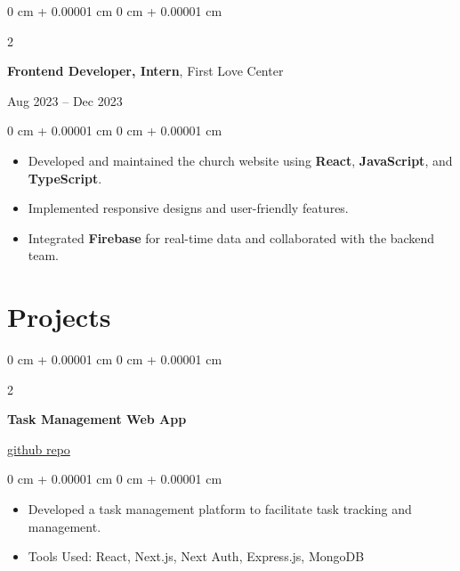 \documentclass[10pt, letterpaper]{article}
\newenvironment{highlights}{
    \begin{itemize}[
        topsep=0.10 cm,
        parsep=0.10 cm,
        partopsep=0pt,
        itemsep=0pt,
        leftmargin=0 cm + 10pt
    ]
}{
    \end{itemize}
} %
\newenvironment{onecolentry}{
    \begin{adjustwidth}{
        0 cm + 0.00001 cm
    }{
        0 cm + 0.00001 cm
    }
}{
    \end{adjustwidth}
} %
\newenvironment{twocolentry}[2][]{
    \onecolentry
    \def\secondColumn{#2}
    \setcolumnwidth{\fill, 4.5 cm}
    \begin{paracol}{2}
}{
    \switchcolumn \raggedleft \secondColumn
    \end{paracol}
    \endonecolentry
} %
\begin{document}
\vspace{0.30 cm}

\begin{twocolentry}{Aug 2023 – Dec 2023}
    \textbf{Frontend Developer, Intern}, First Love Center
\end{twocolentry}

\vspace{0.10 cm}
\begin{onecolentry}
    \begin{highlights}
        \item Developed and maintained the church website using \textbf{React},
        \textbf{JavaScript}, and \textbf{TypeScript}.
        \item Implemented responsive designs and user-friendly features.
        \item Integrated \textbf{Firebase} for real-time data and collaborated with the
        backend team.
    \end{highlights}
\end{onecolentry}

\vspace{0.30 cm}

\section{Projects}

\begin{twocolentry}{\href{https://github.com/murvyn/taskify}{github repo}}
    \textbf{Task Management Web App}
\end{twocolentry}
\vspace{0.10 cm}
\begin{onecolentry}
    \begin{highlights}
        \item Developed a task management platform to facilitate task tracking and
        management.
        \item Tools Used: React, Next.js, Next Auth, Express.js, MongoDB
    \end{highlights}
\end{onecolentry}

\vspace{0.2 cm}
\end{document}
